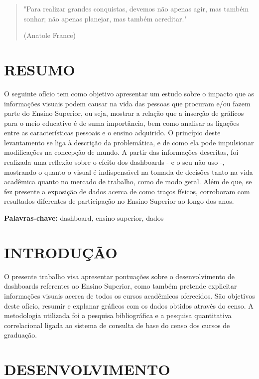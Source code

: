 \documentclass[a4paper,12pt]{article}
\begin{document}
\begin{quote}
    \centering
    "Para realizar grandes conquistas, devemos não apenas agir, mas também sonhar; não apenas planejar, mas também acreditar." 

    (Anatole France)
\end{quote}

\section{RESUMO}
O seguinte ofício tem como objetivo apresentar um estudo sobre o impacto que as informações visuais podem causar na vida das pessoas que procuram e/ou fazem parte do Ensino Superior, ou seja, mostrar a relação que a inserção de gráficos para o meio educativo é de suma importância, bem como analisar as ligações entre as características pessoais e o ensino adquirido. O princípio deste levantamento se liga à descrição da problemática, e de como ela pode impulsionar modificações na concepção de mundo. A partir das informações descritas, foi realizada uma reflexão sobre o efeito dos dashboards - e o seu não uso -, mostrando o quanto o visual é indispensável na tomada de decisões tanto na vida acadêmica quanto no mercado de trabalho, como de modo geral. Além de que, se fez presente a exposição de dados acerca de como traços físicos, corroboram com resultados diferentes de participação no Ensino Superior ao longo dos anos.

\textbf{Palavras-chave:} dashboard, ensino superior, dados

\newpage

\tableofcontents

\newpage

\section{INTRODUÇÃO}
O presente trabalho visa apresentar pontuações sobre o desenvolvimento de dashboards referentes ao Ensino Superior, como também pretende explicitar informações visuais acerca de todos os cursos acadêmicos oferecidos. São objetivos deste ofício, resumir e explanar gráficos com os dados obtidos através do censo. A metodologia utilizada foi a pesquisa bibliográfica e a pesquisa quantitativa correlacional ligada ao sistema de consulta de base do censo dos cursos de graduação.
\section{DESENVOLVIMENTO}
\end{document}
